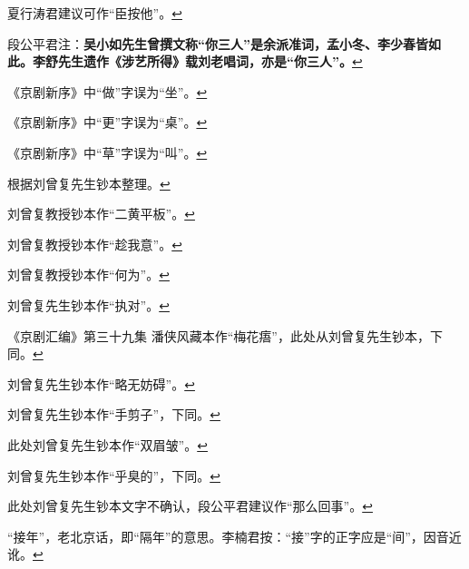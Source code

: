   \leavevmode\hypertarget{fn565}{}%
  夏行涛君建议可作``臣按他''。\protect\hyperlink{fnref565}{↩}
\item
  \leavevmode\hypertarget{fn566}{}%
  段公平君注：\textbf{吴小如先生曾撰文称``你三人''是余派准词，孟小冬、李少春皆如此。李舒先生遗作《涉艺所得》载刘老唱词，亦是``你三人''。}\protect\hyperlink{fnref566}{↩}
\item
  \leavevmode\hypertarget{fn567}{}%
  《京剧新序》中``做''字误为``坐''。\protect\hyperlink{fnref567}{↩}
\item
  \leavevmode\hypertarget{fn568}{}%
  《京剧新序》中``更''字误为``桌''。\protect\hyperlink{fnref568}{↩}
\item
  \leavevmode\hypertarget{fn569}{}%
  《京剧新序》中``草''字误为``叫''。\protect\hyperlink{fnref569}{↩}
\item
  \leavevmode\hypertarget{fn570}{}%
  根据刘曾复先生钞本整理。\protect\hyperlink{fnref570}{↩}
\item
  \leavevmode\hypertarget{fn571}{}%
  刘曾复教授钞本作``二黄平板''。\protect\hyperlink{fnref571}{↩}
\item
  \leavevmode\hypertarget{fn572}{}%
  刘曾复教授钞本作``趁我意''。\protect\hyperlink{fnref572}{↩}
\item
  \leavevmode\hypertarget{fn573}{}%
  刘曾复教授钞本作``何为''。\protect\hyperlink{fnref573}{↩}
\item
  \leavevmode\hypertarget{fn574}{}%
  刘曾复先生钞本作``执对''。\protect\hyperlink{fnref574}{↩}
\item
  \leavevmode\hypertarget{fn575}{}%
  《京剧汇编》第三十九集
  潘侠风藏本作``梅花痦''，此处从刘曾复先生钞本，下同。\protect\hyperlink{fnref575}{↩}
\item
  \leavevmode\hypertarget{fn576}{}%
  刘曾复先生钞本作``略无妨碍''。\protect\hyperlink{fnref576}{↩}
\item
  \leavevmode\hypertarget{fn577}{}%
  刘曾复先生钞本作``手剪子''，下同。\protect\hyperlink{fnref577}{↩}
\item
  \leavevmode\hypertarget{fn578}{}%
  此处刘曾复先生钞本作``双眉皱''。\protect\hyperlink{fnref578}{↩}
\item
  \leavevmode\hypertarget{fn579}{}%
  刘曾复先生钞本作``乎臭的''，下同。\protect\hyperlink{fnref579}{↩}
\item
  \leavevmode\hypertarget{fn580}{}%
  此处刘曾复先生钞本文字不确认，段公平君建议作``那么回事''。\protect\hyperlink{fnref580}{↩}
\item
  \leavevmode\hypertarget{fn581}{}%
  ``接年''，老北京话，即``隔年''的意思。李楠君按：``接''字的正字应是``间''，因音近讹。\protect\hyperlink{fnref581}{↩}
